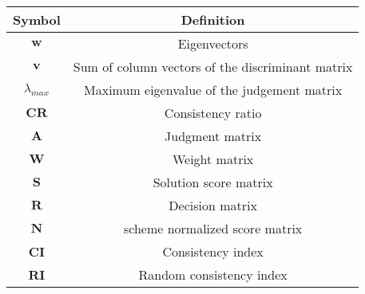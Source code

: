 \begin{table}[h]
	\begin{center}
		\begin{tabular}{cc}
			\toprule[1.5pt]
			Symbol&Definition\\
			\midrule[1pt]
			\(\mathbf{w}\)&Eigenvectors\\ 
			\(\mathbf{v}\)&Sum of column vectors of the discriminant matrix \\
			\(\lambda_{max}\)&Maximum eigenvalue of the judgement matrix\\
			\(\mathbf{CR}\)&Consistency ratio\\
			\(\mathbf{A}\)&Judgment matrix\\
			\(\mathbf{W}\)&Weight matrix\\
			\(\mathbf{S}\)&Solution score matrix\\
			\(\mathbf{R}\)&Decision matrix\\
			\(\mathbf{N}\)&scheme normalized score  matrix\\
			\(\mathbf{CI}\)&Consistency index\\
			\(\mathbf{RI}\)&Random consistency index\\


            
			\bottomrule[1.5pt]
		\end{tabular}
	\end{center}
\end{table}

